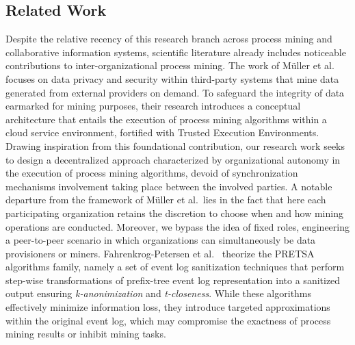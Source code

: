 \subsection{Related Work}
Despite the relative recency of this research branch across process mining and collaborative information systems, scientific literature already includes noticeable contributions to inter-organizational process mining. %
The work of M{\"u}ller et al.~\cite{muller2021process} focuses on data privacy and security within third-party systems that mine data generated from external providers on demand. To safeguard the integrity of data earmarked for mining purposes, their research introduces a conceptual architecture that entails the execution of process mining algorithms within a cloud service environment, fortified with Trusted Execution Environments. %
Drawing inspiration from this foundational contribution, our research work seeks to design a decentralized approach characterized by organizational autonomy in the execution of process mining algorithms, devoid of synchronization mechanisms involvement taking place between the involved parties. A notable departure from the framework of M{\"u}ller et al.\ lies in the fact that here %
each participating organization retains the discretion to choose when and how mining operations are conducted. Moreover, we bypass the idea of fixed roles, engineering a peer-to-peer scenario in which organizations can simultaneously be data provisioners or miners. Fahrenkrog-Petersen et al.~\cite{DBLP:journals/dke/FahrenkrogPetersenAW23,DBLP:conf/icpm/Fahrenkrog-Petersen19} theorize the PRETSA algorithms family, namely a set of event log sanitization techniques that perform step-wise transformations of prefix-tree event log representation into a sanitized output ensuring \emph{k-anonimization} and \emph{t-closeness}. While these algorithms effectively minimize information loss, they introduce targeted approximations within the original event log, which may compromise the exactness of process mining results or inhibit mining tasks. 
